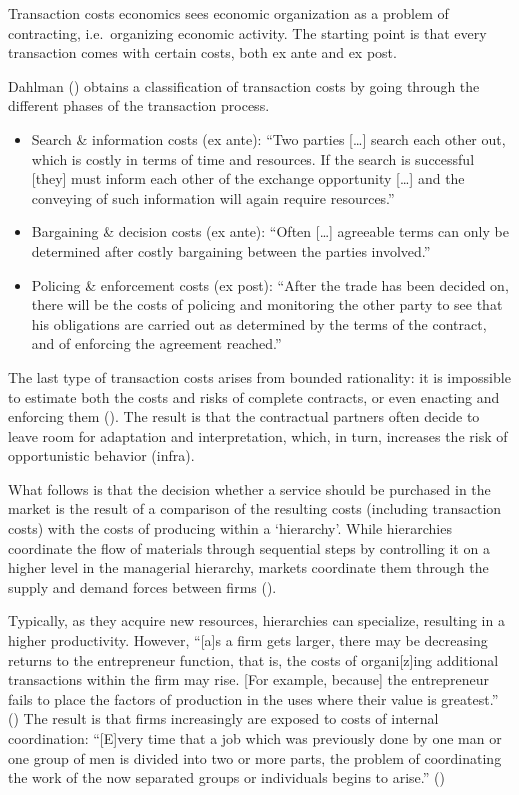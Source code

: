 \documentclass[
  man,floatsintext]{apa6}
\begin{document}
Transaction costs economics sees economic organization as a problem of contracting, i.e.~organizing economic activity. The starting point is that every transaction comes with certain costs, both ex ante and ex post.

Dahlman () obtains a classification of transaction costs by going through the different phases of the transaction process.

\begin{itemize}
\item
  Search \& information costs (ex ante): ``Two parties {[}\ldots{]} search each other out, which is costly in terms of time and resources. If the search is successful {[}they{]} must inform each other of the exchange opportunity {[}\ldots{]} and the conveying of such information will again require resources.''
\item
  Bargaining \& decision costs (ex ante): ``Often {[}\ldots{]} agreeable terms can only be determined after costly bargaining between the parties involved.''
\item
  Policing \& enforcement costs (ex post): ``After the trade has been decided on, there will be the costs of policing and monitoring the other party to see that his obligations are carried out as determined by the terms of the contract, and of enforcing the agreement reached.''
\end{itemize}

The last type of transaction costs arises from bounded rationality: it is impossible to estimate both the costs and risks of complete contracts, or even enacting and enforcing them (). The result is that the contractual partners often decide to leave room for adaptation and interpretation, which, in turn, increases the risk of opportunistic behavior (infra).

What follows is that the decision whether a service should be purchased in the market is the result of a comparison of the resulting costs (including transaction costs) with the costs of producing within a `hierarchy'. While hierarchies coordinate the flow of materials through sequential steps by controlling it on a higher level in the managerial hierarchy, markets coordinate them through the supply and demand forces between firms ().

Typically, as they acquire new resources, hierarchies can specialize, resulting in a higher productivity. However, ``{[}a{]}s a firm gets larger, there may be decreasing returns to the entrepreneur function, that is, the costs of organi{[}z{]}ing additional transactions within the firm may rise. {[}For example, because{]} the entrepreneur fails to place the factors of production in the uses where their value is greatest.'' () The result is that firms increasingly are exposed to costs of internal coordination: ``{[}E{]}very time that a job which was previously done by one man or one group of men is divided into two or more parts, the problem of coordinating the work of the now separated groups or individuals begins to arise.'' ()
\end{document}
